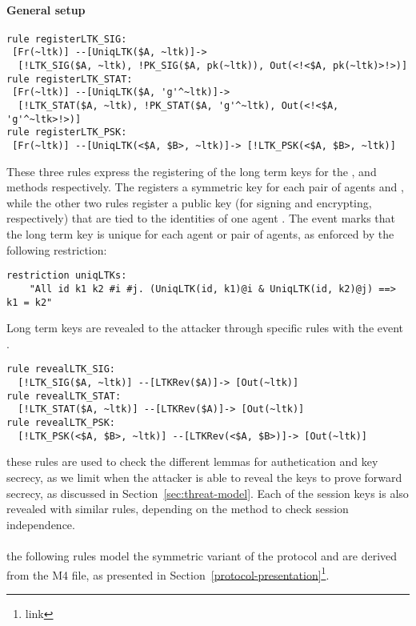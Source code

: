 

\paragraph{General setup}
\begin{lstlisting}
rule registerLTK_SIG:
 [Fr(~ltk)] --[UniqLTK($A, ~ltk)]->
  [!LTK_SIG($A, ~ltk), !PK_SIG($A, pk(~ltk)), Out(<!<$A, pk(~ltk)>!>)]
rule registerLTK_STAT:
 [Fr(~ltk)] --[UniqLTK($A, 'g'^~ltk)]->
  [!LTK_STAT($A, ~ltk), !PK_STAT($A, 'g'^~ltk), Out(<!<$A, 'g'^~ltk>!>)]
rule registerLTK_PSK:
 [Fr(~ltk)] --[UniqLTK(<$A, $B>, ~ltk)]-> [!LTK_PSK(<$A, $B>, ~ltk)]
\end{lstlisting}
    
These three rules express the registering of the long term keys for the \mSig,
\mStat{} and \mPsk{} methods respectively.
%
The  registers a symmetric key for each pair of
agents  and , while the other two rules register a
public key (for signing and encrypting, respectively) that are tied to the
identities of one agent .
%
The event  marks that the long term key is unique for each
agent or pair of agents, as enforced by the following restriction:
\begin{lstlisting}
restriction uniqLTKs:
    "All id k1 k2 #i #j. (UniqLTK(id, k1)@i & UniqLTK(id, k2)@j) ==> k1 = k2"
\end{lstlisting}

Long term keys are revealed to the attacker through specific rules
with the event .
\begin{lstlisting}
rule revealLTK_SIG:
  [!LTK_SIG($A, ~ltk)] --[LTKRev($A)]-> [Out(~ltk)]
rule revealLTK_STAT:
  [!LTK_STAT($A, ~ltk)] --[LTKRev($A)]-> [Out(~ltk)]
rule revealLTK_PSK:
  [!LTK_PSK(<$A, $B>, ~ltk)] --[LTKRev(<$A, $B>)]-> [Out(~ltk)]
\end{lstlisting}
these rules are used to check the different lemmas for authetication
and key secrecy, as we limit when the attacker is able to reveal the
keys to prove forward secrecy, as discussed in
Section~\ref{sec:threat-model}.
%
Each of the session keys is also revealed with similar rules,
depending on the method to check session independence.

\paragraph{\mPskPsk{}} the following rules model the symmetric variant of
the protocol and are derived from the M4 file, as presented in
Section~\ref{protocol-presentation}\footnote{link}.

